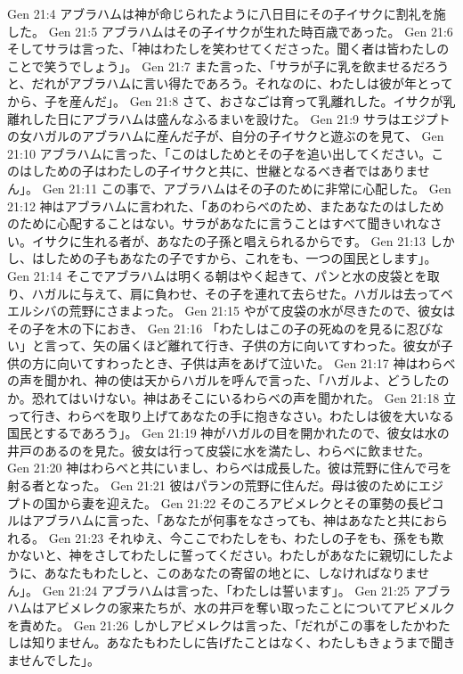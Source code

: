 Gen 21:4  アブラハムは神が命じられたように八日目にその子イサクに割礼を施した。
Gen 21:5  アブラハムはその子イサクが生れた時百歳であった。
Gen 21:6  そしてサラは言った、「神はわたしを笑わせてくださった。聞く者は皆わたしのことで笑うでしょう」。
Gen 21:7  また言った、「サラが子に乳を飲ませるだろうと、だれがアブラハムに言い得たであろう。それなのに、わたしは彼が年とってから、子を産んだ」。
Gen 21:8  さて、おさなごは育って乳離れした。イサクが乳離れした日にアブラハムは盛んなふるまいを設けた。
Gen 21:9  サラはエジプトの女ハガルのアブラハムに産んだ子が、自分の子イサクと遊ぶのを見て、
Gen 21:10  アブラハムに言った、「このはしためとその子を追い出してください。このはしための子はわたしの子イサクと共に、世継となるべき者ではありません」。
Gen 21:11  この事で、アブラハムはその子のために非常に心配した。
Gen 21:12  神はアブラハムに言われた、「あのわらべのため、またあなたのはしためのために心配することはない。サラがあなたに言うことはすべて聞きいれなさい。イサクに生れる者が、あなたの子孫と唱えられるからです。
Gen 21:13  しかし、はしための子もあなたの子ですから、これをも、一つの国民とします」。
Gen 21:14  そこでアブラハムは明くる朝はやく起きて、パンと水の皮袋とを取り、ハガルに与えて、肩に負わせ、その子を連れて去らせた。ハガルは去ってベエルシバの荒野にさまよった。
Gen 21:15  やがて皮袋の水が尽きたので、彼女はその子を木の下におき、
Gen 21:16  「わたしはこの子の死ぬのを見るに忍びない」と言って、矢の届くほど離れて行き、子供の方に向いてすわった。彼女が子供の方に向いてすわったとき、子供は声をあげて泣いた。
Gen 21:17  神はわらべの声を聞かれ、神の使は天からハガルを呼んで言った、「ハガルよ、どうしたのか。恐れてはいけない。神はあそこにいるわらべの声を聞かれた。
Gen 21:18  立って行き、わらべを取り上げてあなたの手に抱きなさい。わたしは彼を大いなる国民とするであろう」。
Gen 21:19  神がハガルの目を開かれたので、彼女は水の井戸のあるのを見た。彼女は行って皮袋に水を満たし、わらべに飲ませた。
Gen 21:20  神はわらべと共にいまし、わらべは成長した。彼は荒野に住んで弓を射る者となった。
Gen 21:21  彼はパランの荒野に住んだ。母は彼のためにエジプトの国から妻を迎えた。
Gen 21:22  そのころアビメレクとその軍勢の長ピコルはアブラハムに言った、「あなたが何事をなさっても、神はあなたと共におられる。
Gen 21:23  それゆえ、今ここでわたしをも、わたしの子をも、孫をも欺かないと、神をさしてわたしに誓ってください。わたしがあなたに親切にしたように、あなたもわたしと、このあなたの寄留の地とに、しなければなりません」。
Gen 21:24  アブラハムは言った、「わたしは誓います」。
Gen 21:25  アブラハムはアビメレクの家来たちが、水の井戸を奪い取ったことについてアビメルクを責めた。
Gen 21:26  しかしアビメレクは言った、「だれがこの事をしたかわたしは知りません。あなたもわたしに告げたことはなく、わたしもきょうまで聞きませんでした」。
